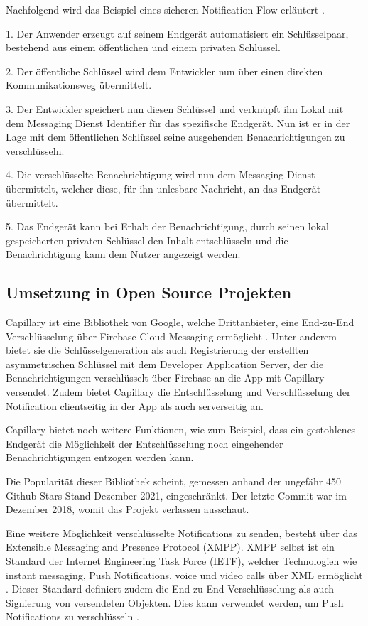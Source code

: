 \documentclass[sigconf]{acmart}
\begin{document}
Nachfolgend wird das Beispiel eines sicheren Notification Flow erläutert \cite{agarwal}.

1. Der Anwender erzeugt auf seinem Endgerät automatisiert ein 
Schlüsselpaar, bestehend aus einem öffentlichen und einem privaten 
Schlüssel.

2. Der öffentliche Schlüssel wird dem Entwickler nun über einen direkten 
Kommunikationsweg übermittelt.

3. Der Entwickler speichert nun diesen Schlüssel und verknüpft ihn Lokal 
mit dem Messaging Dienst Identifier für das spezifische Endgerät. 
Nun ist er in der Lage mit dem öffentlichen Schlüssel seine ausgehenden 
Benachrichtigungen zu verschlüsseln.

4. Die verschlüsselte Benachrichtigung wird nun dem Messaging Dienst 
übermittelt, welcher diese, für ihn unlesbare Nachricht, an das Endgerät 
übermittelt.

5. Das Endgerät kann bei Erhalt der Benachrichtigung, durch seinen lokal 
gespeicherten privaten Schlüssel den Inhalt entschlüsseln und die 
Benachrichtigung kann dem Nutzer angezeigt werden.

\subsection{Umsetzung in Open Source Projekten}

Capillary ist eine Bibliothek von Google, welche Drittanbieter, eine End-zu-End 
Verschlüsselung über Firebase Cloud Messaging ermöglicht \cite{capillary}. Unter anderem 
bietet sie die Schlüsselgeneration als auch Registrierung der erstellten 
asymmetrischen Schlüssel mit dem Developer Application Server, der die 
Benachrichtigungen verschlüsselt über Firebase an die App mit Capillary 
versendet. Zudem bietet Capillary die Entschlüsselung und Verschlüsselung 
der Notification clientseitig in der App als auch serverseitig an.

Capillary bietet noch weitere Funktionen, wie zum Beispiel, dass ein gestohlenes 
Endgerät die Möglichkeit der Entschlüsselung noch eingehender Benachrichtigungen 
entzogen werden kann.

Die Popularität dieser Bibliothek scheint, gemessen anhand der ungefähr 
450 Github Stars Stand Dezember 2021, eingeschränkt. Der letzte Commit 
war im Dezember 2018, womit das Projekt verlassen ausschaut.

Eine weitere Möglichkeit verschlüsselte Notifications zu senden, 
besteht über das Extensible Messaging and Presence Protocol (XMPP).
XMPP selbst ist ein Standard der Internet Engineering Task Force (IETF), 
welcher Technologien wie instant messaging, Push Notifications, voice und 
video calls über XML ermöglicht \cite{xmpp}\cite{xmpp3}.  Dieser Standard definiert zudem die 
End-zu-End Verschlüsselung als auch Signierung von versendeten Objekten. 
Dies kann verwendet werden, um Push Notifications zu verschlüsseln \cite{xmpp2}.
\end{document}
